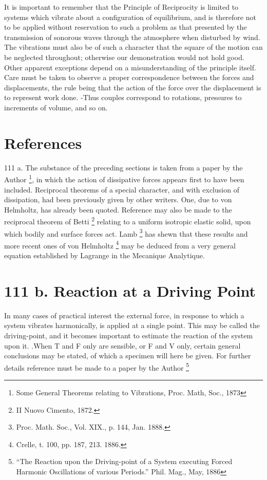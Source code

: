 It is important to remember that the Principle of Reciprocity is limited to
systems which vibrate about a configuration of equilibrium, and is therefore
not to be applied without reservation to such a problem as that presented by
the transmission of sonorous waves through the atmosphere when disturbed by
wind. The vibrations must also be of such a character that the square of the
motion can be neglected throughout; otherwise our demonstration would not hold
good. Other apparent exceptions depend on a misunderstanding of the principle
itself. Care must be taken to observe a proper correspondence between the
forces and displacements, the rule being that the action of the force over the
displacement is to represent work done. -Thus couples correspond to rotations,
pressures to increments of volume, and so on.

\section{References}
111 a.
The substance of the preceding sections is taken from %
a paper by the Author \footnote{Some General Theorems relating to Vibrations, Proc. Math, Soc., 1873},
in which the action of dissipative forces
appears first to have been included. Reciprocal theorems of a
special character, and with exclusion of dissipation, had been
previously given by other writers. One, due to von Helmholtz,
has already been quoted. Reference may also be made to the
reciprocal theorem of Betti \footnote{II Nuovo Cimento, 1872.}
relating to a uniform isotropic elastic
solid, upon which bodily and surface forces act. Lamb \footnote{Proc. Math. Soc., Vol. XIX., p. 144, Jan. 1888.}
has shewn that these results and more recent ones of von Helmholtz \footnote{Crelle, t. 100, pp. 187, 213. 1886.}
may be deduced from a very general equation established by Lagrange
in the Mecanique Analytique.

\section{111 b. Reaction at a Driving Point}
In many cases of practical interest the external force,
in response to which a system vibrates harmonically, is applied at a
single point. This may be called the driving-point, and it becomes
important to estimate the reaction of the system upon it. .When
T and F only are sensible, or F and V only, certain general
conclusions may be stated, of which a specimen will here be given.
For further details reference must be made to a paper by the
Author \footnote{“The Reaction upon the Driving-point of a System executing
Forced Harmonic Oscillations of various Periods.” Phil. Mag., May, 1886}

